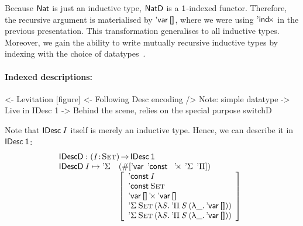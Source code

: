 Because $\Nat$ is just an inductive type, $\NatD$ is a $\Unit$-indexed
functor. Therefore, the recursive argument is materialised by
$\DVar{\Void}$, where we were using $\SYMBDIndx$ in the previous
presentation. This transformation generalises to all inductive
types. Moreover, we gain the ability to write mutually recursive
inductive types by indexing with the choice of
datatypes~\cite{paulin:habilitation, yakushev:mutual-def}.



\paragraph{Indexed descriptions:}

\begin{wstructure}
<- Levitation [figure]
    <- Following Desc encoding
        /> Note: simple datatype
            -> Live in IDesc 1
    -> Behind the scene, relies on the special purpose switchD
\end{wstructure}

Note that $\IDesc{\V{I}}$ itself is merely an inductive type. Hence,
we can describe it in $\IDesc{\Unit}$:
%
\[\stk{
\IDescD : \PI{\V{I}}{\Set} \IDesc{\Unit} \\
\begin{array}{@{}ll}
\IDescD\: \V{I} \mapsto \SYMBDSigma & (\EnumT \sqr{ 
                                          \SYMBDVar\:\:
                                          \SYMBDConst\:\:
                                          \DProd\:\:
                                          \SYMBDSigma\:\:
                                          \SYMBDPi
                                             }) \\
                              & \bigRedBracket{\begin{array}{l}
                                      \DConst{\V{I}}                  \\
                                      \DConst{\Set}               \\
                                      \DProd{\DVar{\Void}}{\DVar{\Void}}  \\
                                      \DSigma{\Set}{(\LAM{\V{S}} \DPi{\V{S}}{(\LAM{\_} \DVar{\Void})})} \\
                                      \DSigma{\Set}{(\LAM{\V{S}} \DPi{\V{S}}{(\LAM{\_} \DVar{\Void})})}
                                   \end{array}}
\end{array}
}\]

